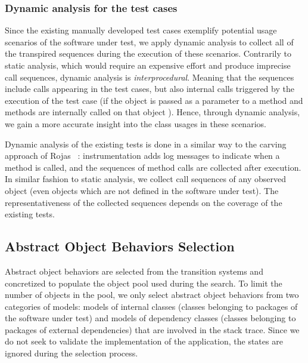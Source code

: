\subsubsection{Dynamic analysis for the test cases}
\label{ssec:dynamicanalysis}

Since the existing manually developed test cases exemplify potential usage scenarios of the software under test, we apply dynamic analysis to collect all of the transpired sequences during the execution of these scenarios. Contrarily to static analysis, which would require an expensive effort and produce imprecise call sequences, dynamic analysis is \emph{interprocedural}. Meaning that the sequences include calls appearing in the test cases, but also internal calls triggered by the execution of the test case (\eg if the object is passed as a parameter to a method and methods are internally called on that object ). Hence, through dynamic analysis, we gain a more accurate insight into the class usages in these scenarios.

Dynamic analysis of the existing tests is done in a similar way to the carving approach of Rojas \etal~\cite{Rojas2016}: instrumentation adds log messages to indicate when a method is called, and the sequences of method calls are collected after execution. In similar fashion to static analysis, we collect call sequences of any observed object (even objects which are not defined in the software under test).
The representativeness of the collected sequences depends on the coverage of the existing tests.



\subsection{Abstract Object Behaviors Selection}
\label{ssec:abstract-selection}

Abstract object behaviors are selected from the transition systems and concretized to populate the object pool used during the search.
%
To limit the number of objects in the pool, we only select abstract object behaviors from two categories of models:  models of internal classes (\ie classes belonging to packages of the software under test) and models of dependency classes (\ie classes belonging to packages of external dependencies) that are involved in the stack trace.
Since we do not seek to validate the implementation of the application, the states are ignored during the selection process.

